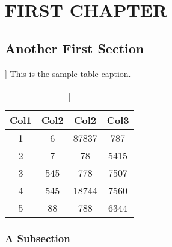 \chapter{FIRST CHAPTER}


\section{Another First Section}



\lipsum[1-2]


\begin{table}[ht]
\renewcommand{\arraystretch}{1.5}
\centering
\caption%
 []
 {This is the sample table caption.\label{table}}
 \begin{tabular}{||c c c c||}
 
 \hline
 Col1 & Col2 & Col2 & Col3 \\ [0.5ex] 
 \hline\hline
 1 & 6 & 87837 & 787 \\ 
 2 & 7 & 78 & 5415 \\
 3 & 545 & 778 & 7507 \\
 4 & 545 & 18744 & 7560 \\
 5 & 88 & 788 & 6344 \\ [1ex] 
 \hline
 \end{tabular}
\end{table}

\subsection{A Subsection}



\lipsum[3-4]\autocite{einstein}
